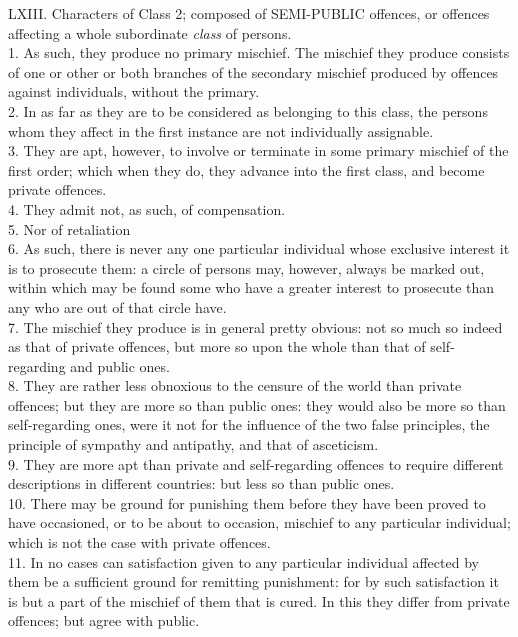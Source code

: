 \documentclass[12pt]{report}
\begin{document}
LXIII. Characters of Class 2; composed of SEMI-PUBLIC offences, or
offences affecting a whole subordinate \emph{class} of persons.\\
1. As such, they produce no primary mischief. The mischief they produce
consists of one or other or both branches of the secondary mischief
produced by offences against individuals, without the primary.\\
2. In as far as they are to be considered as belonging to this class,
the persons whom they affect in the first instance are not individually
assignable.\\
3. They are apt, however, to involve or terminate in some primary
mischief of the first order; which when they do, they advance into the
first class, and become private offences.\\
4. They admit not, as such, of compensation.\\
5. Nor of retaliation\\
6. As such, there is never any one particular individual whose exclusive
interest it is to prosecute them: a circle of persons may, however,
always be marked out, within which may be found some who have a greater
interest to prosecute than any who are out of that circle have.\\
7. The mischief they produce is in general pretty obvious: not so much
so indeed as that of private offences, but more so upon the whole than
that of self-regarding and public ones.\\
8. They are rather less obnoxious to the censure of the world than
private offences; but they are more so than public ones: they would also
be more so than self-regarding ones, were it not for the influence of
the two false principles, the principle of sympathy and antipathy, and
that of asceticism.\\
9. They are more apt than private and self-regarding offences to require
different descriptions in different countries: but less so than public
ones.\\
10. There may be ground for punishing them before they have been proved
to have occasioned, or to be about to occasion, mischief to any
particular individual; which is not the case with private offences.\\
11. In no cases can satisfaction given to any particular individual
affected by them be a sufficient ground for remitting punishment: for by
such satisfaction it is but a part of the mischief of them that is
cured. In this they differ from private offences; but agree with public.
\end{document}
